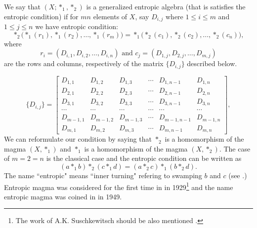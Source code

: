 \documentclass[12pt]{amsart}
\begin{document}
We say that $(X;*_1,*_2)$ is a generalized entropic algebra (that is satisfies the entropic condition) if
for $mn$ elements of $X$, say $D_{i,j}$ where $1\leq i \leq m$ and $1\leq j \leq n$ we have entropic condition:
\begin{equation*}
*_2\bigg(*_1(r_1),*_1(r_2),\ldots,*_1(r_m)\bigg) = *_1\bigg(*_2(c_1),*_2(c_2),\ldots,*_2(c_n)\bigg),    
\end{equation*}
where 
\begin{equation*}
r_i=(D_{i,1},D_{i,2},\ldots,D_{i,n})\,\,\text{and}\,\, c_j=(D_{1,j},D_{2,j},\ldots,D_{m,j})
\end{equation*}
are the rows and columns, respectively of the matrix $\{D_{i,j}\}$ described below.

\[ \{D_{i,j}\}=
\left[
\begin{array}{cccccc}
D_{1,1} & D_{1,2} & D_{1,3} &  \cdots & D_{1,n-1} & D_{1,n} \\
D_{2,1} & D_{2,2} & D_{2,3} &  \cdots & D_{2,n-1} & D_{2,n} \\
D_{3,1} & D_{3,2} & D_{3,3} &  \cdots & D_{3,n-1} & D_{3,n} \\
\cdots  & \cdots   &\cdots  &\cdots   &\cdots     & \cdots  \\
D_{m-1,1} & D_{m-1,2} & D_{m-1,3} & \cdots & D_{m-1,n-1} & D_{m-1,n} \\
D_{m,1}   & D_{m,2}   & D_{m,3}   & \cdots & D_{m,n-1}   & D_{m,n}
\end{array}
\right],
\]
We can reformulate our condition by saying that $*_2$ is a homomorphism of the magma $(X,*_1)$ and $*_1$ is a
homomorphism of the magma $(X,*_2)$.
The case of $m=2=n$ is the classical case and the entropic condition can be written as 
\begin{equation*}
(a*_1b)*_2(c*_1d)=(a*_2c)*_1(b*_2d).
\end{equation*}
The name ``entropic" means ``inner turning" refering to swamping $b$ and $c$ (see \cite{RoSm,SmRo}.)
Entropic magma was considered for the first time in \cite{BuMa} in 1929\footnote{The work of A.K. Suschkewitsch should be also mentioned \cite{Sus,Hol}.} and the name entropic magma was coined in \cite{Eth} in 1949.
\end{document}
